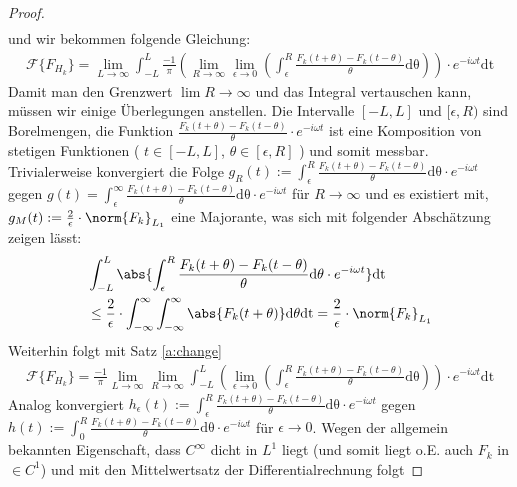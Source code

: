 \begin{satz}
\begin{proof}
\begin{align}
\end{align}
und wir bekommen folgende Gleichung:
\begin{align}
\mathscr{F}\{F_{H_k}\} =  \lim_{L \rightarrow \infty} \int_{-L}^{L} \frac{-1}{\pi} \left( \lim_{R \rightarrow \infty} \lim_{\epsilon \rightarrow 0} \left( \int_{\epsilon}^{R} \frac{F_k(t + \theta)- F_k(t - \theta)}{\theta} \mathrm{d\theta} \right) \right) \cdot e^{-i \omega t} \mathrm{dt} 
\end{align}
Damit man den Grenzwert $\lim{R\rightarrow \infty}$ und das Integral vertauschen kann, müssen wir einige Überlegungen anstellen.	 Die Intervalle $[-L, L]$ und $[\epsilon, R)$ sind Borelmengen, die Funktion $\frac{F_k(t + \theta)- F_k(t - \theta)}{\theta} \cdot e^{-i \omega t}$ ist eine Komposition von stetigen Funktionen ( $t \in [-L, L]$, $ \theta \in [\epsilon, R]$ ) und somit messbar. Trivialerweise konvergiert die Folge $g_R(t) := \int_{\epsilon}^{R} \frac{F_k(t + \theta)- F_k(t - \theta)}{\theta} \mathrm{d\theta}\cdot e^{-i \omega t}$ gegen $g(t) = \int_{\epsilon}^{\infty} \frac{F_k(t + \theta)- F_k(t - \theta)}{\theta} \mathrm{d\theta} \cdot e^{-i \omega t}$ für $R \rightarrow \infty$ und es existiert mit, $g_M(t):= \frac{2}{\epsilon} \cdot \norm{F_k}_{L_1}$ eine Majorante, was sich mit folgender Abschätzung zeigen lässt: 
\begin{align}
&\int_{-L}^{L} \abs{\int_{\epsilon}^{R} \frac{F_k(t + \theta)- F_k(t - \theta)}{\theta} \mathrm{d\theta}\cdot e^{-i \omega t}} \mathrm{dt} \\
&\leq \frac{2}{\epsilon} \cdot \int_{-\infty}^{\infty} \int_{-\infty}^{\infty}  \abs{F_k(t + \theta)} \mathrm{d\theta}  \mathrm{dt} = \frac{2}{\epsilon} \cdot \norm{F_k}_{L_1}
\end{align}
Weiterhin folgt mit Satz \ref{a:change}
\begin{align}
	\mathscr{F}\{F_{H_k}\} =  \frac{-1}{\pi} \lim_{L \rightarrow \infty} \lim_{R \rightarrow \infty} \int_{-L}^{L} \left( \lim_{\epsilon \rightarrow 0} \left( \int_{\epsilon}^{R} \frac{F_k(t + \theta)- F_k(t - \theta)}{\theta} \mathrm{d\theta} \right) \right) \cdot e^{-i \omega t} \mathrm{dt} 
\end{align}
Analog konvergiert $h_{\epsilon}(t) := \int_{\epsilon}^{R} \frac{F_k(t + \theta)- F_k(t - \theta)}{\theta} \mathrm{d\theta}\cdot e^{-i \omega t}$ gegen $h(t) := \int_{0}^{R} \frac{F_k(t + \theta)- F_k(t - \theta)}{\theta} \mathrm{d\theta}\cdot e^{-i \omega t}$ für $\epsilon \rightarrow 0$. Wegen der allgemein bekannten Eigenschaft, dass $C^{\infty}$ dicht in $L^1$ liegt (und somit liegt o.E. auch $F_k$ in $\in C^{1}$) und mit den Mittelwertsatz der Differentialrechnung folgt

\end{proof}
\end{satz}

